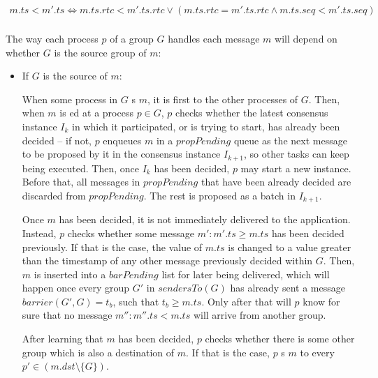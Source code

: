 \documentclass[times, 10pt]{article}
\begin{document}
\begin{align*}
m.ts < m'.ts \Longleftrightarrow m.ts.rtc < m'.ts.rtc \vee (m.ts.rtc = m'.ts.rtc \wedge m.ts.seq < m'.ts.seq)\\
\end{align*}

The way each process $p$ of a group $G$ handles each message $m$ will depend on whether $G$ is the source group of $m$:

\begin{itemize}
  \item If $G$ is the source of $m$:
  
  When some process in $G$ \cms{}s $m$, it is first \rmc{} to the other processes of $G$. Then, when $m$ is \rmd{}ed at a process $p \in G$, $p$ checks whether the latest consensus instance $I_{k}$ in which it participated, or is trying to start, has already been decided -- if not, $p$ enqueues $m$ in a $propPending$ queue as the next message to be proposed by it in the consensus instance $I_{k+1}$, so other tasks can keep being executed. Then, once $I_{k}$ has been decided, $p$ may start a new instance. Before that, all messages in $propPending$ that have been already decided are discarded from $propPending$. The rest is proposed as a batch in $I_{k+1}$.
  
  Once $m$ has been decided, it is not immediately delivered to the application. Instead, $p$ checks whether some message $m' : m'.ts \geq m.ts$ has been decided previously. If that is the case, the value of $m.ts$ is changed to a value greater than the timestamp of any other message previously decided within $G$. Then, $m$ is inserted into a $barPending$ list for later being delivered, which will happen once every group $G'$ in $sendersTo(G)$ has already sent a message $barrier(G',G) = t_b$, such that $t_b \geq m.ts$. Only after that will $p$ know for sure that no message $m'' : m''.ts < m.ts$ will arrive from another group.
  
  After learning that $m$ has been decided, $p$ checks whether there is some other group which is also a destination of $m$. If that is the case, $p$ \rmc{}s $m$ to every \mbox{$p' \in (m.dst \setminus \{G\})$}.


\end{itemize}
\end{document}
